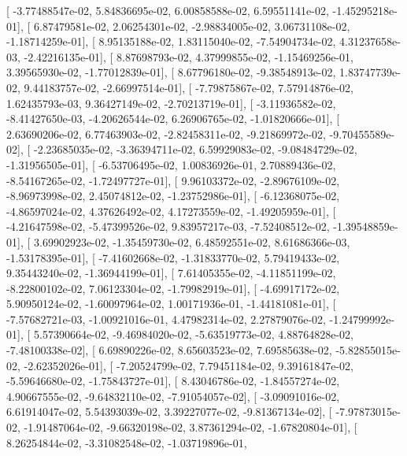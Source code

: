 \documentclass{article}
\begin{document}
       [ -3.77488547e-02,   5.84836695e-02,   6.00858588e-02,
          6.59551141e-02,  -1.45295218e-01],
       [  6.87479581e-02,   2.06254301e-02,  -2.98834005e-02,
          3.06731108e-02,  -1.18714259e-01],
       [  8.95135188e-02,   1.83115040e-02,  -7.54904734e-02,
          4.31237658e-03,  -2.42216135e-01],
       [  8.87698793e-02,   4.37999855e-02,  -1.15469256e-01,
          3.39565930e-02,  -1.77012839e-01],
       [  8.67796180e-02,  -9.38548913e-02,   1.83747739e-02,
          9.44183757e-02,  -2.66997514e-01],
       [ -7.79875867e-02,   7.57914876e-02,   1.62435793e-03,
          9.36427149e-02,  -2.70213719e-01],
       [ -3.11936582e-02,  -8.41427650e-03,  -4.20626544e-02,
          6.26906765e-02,  -1.01820666e-01],
       [  2.63690206e-02,   6.77463903e-02,  -2.82458311e-02,
         -9.21869972e-02,  -9.70455589e-02],
       [ -2.23685035e-02,  -3.36394711e-02,   6.59929083e-02,
         -9.08484729e-02,  -1.31956505e-01],
       [ -6.53706495e-02,   1.00836926e-01,   2.70889436e-02,
         -8.54167265e-02,  -1.72497727e-01],
       [  9.96103372e-02,  -2.89676109e-02,  -8.96973998e-02,
          2.45074812e-02,  -1.23752986e-01],
       [ -6.12368075e-02,  -4.86597024e-02,   4.37626492e-02,
          4.17273559e-02,  -1.49205959e-01],
       [ -4.21647598e-02,  -5.47399526e-02,   9.83957217e-03,
         -7.52408512e-02,  -1.39548859e-01],
       [  3.69902923e-02,  -1.35459730e-02,   6.48592551e-02,
          8.61686366e-03,  -1.53178395e-01],
       [ -7.41602668e-02,  -1.31833770e-02,   5.79419433e-02,
          9.35443240e-02,  -1.36944199e-01],
       [  7.61405355e-02,  -4.11851199e-02,  -8.22800102e-02,
          7.06123304e-02,  -1.79982919e-01],
       [ -4.69917172e-02,   5.90950124e-02,  -1.60097964e-02,
          1.00171936e-01,  -1.44181081e-01],
       [ -7.57682721e-03,  -1.00921016e-01,   4.47982314e-02,
          2.27879076e-02,  -1.24799992e-01],
       [  5.57390664e-02,  -9.46984020e-02,  -5.63519773e-02,
          4.88764828e-02,  -7.48100338e-02],
       [  6.69890226e-02,   8.65603523e-02,   7.69585638e-02,
         -5.82855015e-02,  -2.62352026e-01],
       [ -7.20524799e-02,   7.79451184e-02,   9.39161847e-02,
         -5.59646680e-02,  -1.75843727e-01],
       [  8.43046786e-02,  -1.84557274e-02,   4.90667555e-02,
         -9.64832110e-02,  -7.91054057e-02],
       [ -3.09091016e-02,   6.61914047e-02,   5.54393039e-02,
          3.39227077e-02,  -9.81367134e-02],
       [ -7.97873015e-02,  -1.91487064e-02,  -9.66320198e-02,
          3.87361294e-02,  -1.67820804e-01],
       [  8.26254844e-02,  -3.31082548e-02,  -1.03719896e-01,
\end{document}
